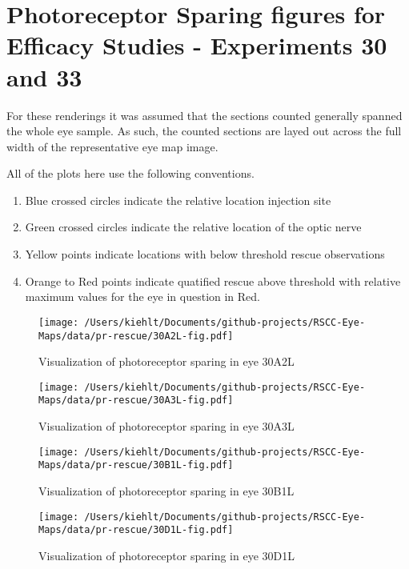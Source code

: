\documentclass{article}
\begin{document}
\pagebreak




\section{Photoreceptor Sparing figures for Efficacy Studies - Experiments 30 and 33}
For these renderings it was assumed that the sections counted generally spanned the whole eye sample. As such, the counted sections are layed out across the full width of the representative eye map image.

All of the plots here use the following conventions. 
\begin{enumerate}
\item Blue crossed circles indicate the relative location injection site
\item Green crossed circles indicate the relative location of the optic nerve
\item Yellow points indicate locations with below threshold rescue observations
\item Orange to Red points indicate quatified rescue above threshold with relative maximum values for the eye in question in Red.
\end{enumerate}
\begin{center}
\begin{figure}
\texttt{[image: /Users/kiehlt/Documents/github-projects/RSCC-Eye-Maps/data/pr-rescue/30A2L-fig.pdf]}
\caption{Visualization of photoreceptor sparing in eye 30A2L}
\label{fig:30A2L}
\end{figure}

\end{center}
\begin{center}
\begin{figure}
\texttt{[image: /Users/kiehlt/Documents/github-projects/RSCC-Eye-Maps/data/pr-rescue/30A3L-fig.pdf]}
\caption{Visualization of photoreceptor sparing in eye 30A3L}
\label{fig:30A3L}
\end{figure}

\end{center}
\begin{center}
\begin{figure}
\texttt{[image: /Users/kiehlt/Documents/github-projects/RSCC-Eye-Maps/data/pr-rescue/30B1L-fig.pdf]}
\caption{Visualization of photoreceptor sparing in eye 30B1L}
\label{fig:30B1L}
\end{figure}

\end{center}
\begin{center}
\begin{figure}
\texttt{[image: /Users/kiehlt/Documents/github-projects/RSCC-Eye-Maps/data/pr-rescue/30D1L-fig.pdf]}
\caption{Visualization of photoreceptor sparing in eye 30D1L}
\label{fig:30D1L}
\end{figure}

\end{center}
\end{document}

